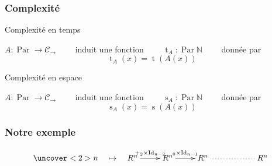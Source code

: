 \documentclass[10pt]{beamer}
\newcommand{\cat}[1]{\mathscr{#1}}
\newcommand{\C}{\cat{C}}
\DeclareMathOperator{\Id}{Id}
\newcommand{\N}{\mathbb{N}}
\newcommand{\ra}{\rightarrow}
\DeclareMathOperator{\Time}{t}
\DeclareMathOperator{\Space}{s}
\DeclareMathOperator{\Par}{Par}
\begin{document}
\begin{frame}
  \frametitle{Complexité}

  \begin{block}{Complexité en temps}
    \begin{center}
      $A:\Par\ra\C_\ra\qquad$ induit une fonction
      $\qquad\Time_A:\Par\N\qquad$ donnée par
      \[\Time_A(x) = \Time(A(x))\]
    \end{center}
  \end{block}

  \begin{block}{Complexité en espace}
    \begin{center}
      $A:\Par\ra\C_\ra\qquad$ induit une fonction
      $\qquad\Space_A:\Par\N\qquad$ donnée par
      \[\Space_A(x) = \Space(A(x))\]
    \end{center}
  \end{block}
\end{frame}



\begin{frame}[fragile]
  \frametitle{Notre exemple}

  \begin{center}
    \begin{minipage}{0.7\textwidth}
\begin{semiverbatim}
\end{semiverbatim}
    \end{minipage}
  \end{center}

  \vfill

  \begin{center}
    \[\uncover<2>{n \quad\mapsto\quad}\xymatrix{
      R^n\ar[r]^{+_2\times{\Id_{n-2}}} & R^n\ar[r]^{\*_0\times{\Id_{n-1}}} &
      R^{n} \ar@{.}[rr] && R^n
    }\]
  \end{center}
\end{frame}
\end{document}
